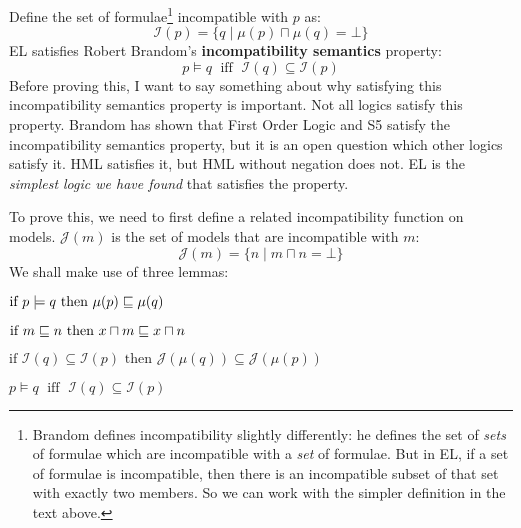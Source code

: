 Define the set of formulae\footnote{Brandom \cite{brandom} defines incompatibility slightly differently: he defines the set of \emph{sets} of formulae which are incompatible with a \emph{set} of formulae. 
But in EL, if a set of formulae is incompatible, then there is an incompatible subset of that set with exactly two members.
So we can work with the simpler definition in the text above.}
 incompatible with $p$ as:
\[
\mathcal{I}(p) = \{ q \; | \; \mu(p) \sqcap \mu(q) = \bot \}
\]
EL satisfies Robert Brandom's \textbf{incompatibility semantics}  property:
\[
p \models q \; \mbox{ iff } \; \mathcal{I}(q) \subseteq \mathcal{I}(p)
\]
Before proving this, I want to say something about why satisfying this incompatibility semantics property is important.
Not all logics satisfy this property. 
Brandom has shown that First Order Logic and S5 satisfy the incompatibility semantics property, but it is an open question which other logics satisfy it.
HML satisfies it, but HML without negation does not.
EL is the \emph{simplest logic we have found} that satisfies the property.

To prove this, we need to first define a related incompatibility function on  models.
$\mathcal{J}(m)$ is the set of models that are incompatible with $m$:
\[
\mathcal{J}(m) = \{ n \; | \; m \sqcap n = \bot \}
\]
We shall make use of three lemmas:
\begin{lemma}
$\mbox{if }p \models q \mbox{ then } \mu(p) \sqsubseteq \mu(q)$
\end{lemma}
\begin{lemma}
$\mbox{if }m \sqsubseteq n \mbox{ then } x \sqcap m \sqsubseteq x \sqcap n$
\end{lemma}
\begin{lemma}
$\mbox{if }\mathcal{I}(q) \subseteq \mathcal{I}(p) \mbox{ then } \mathcal{J}(\mu(q)) \subseteq \mathcal{J}(\mu(p))$
\end{lemma}

\begin{theorem}
$p \models q \; \mbox{ iff } \; \mathcal{I}(q) \subseteq \mathcal{I}(p)$
\end{theorem}

